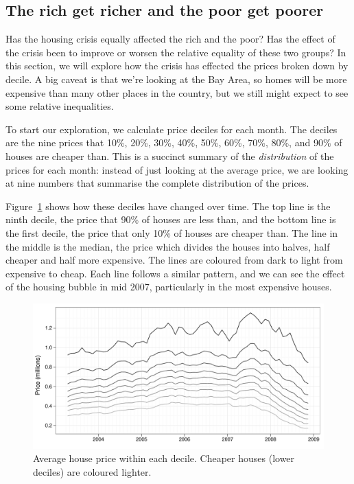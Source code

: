 \documentclass[oneside]{article}
\begin{document}
\subsection{The rich get richer and the poor get poorer}

Has the housing crisis equally affected the rich and the poor?  Has the effect of the crisis been to improve or worsen the relative equality of these two groups?  In this section, we will explore how the crisis has effected the prices broken down by decile.  A big caveat is that we're looking at the Bay Area, so homes will be more expensive than many other places in the country, but we still might expect to see some relative inequalities.

To start our exploration, we calculate price deciles for each month.  The deciles are the nine prices that 10\%, 20\%, 30\%, 40\%, 50\%, 60\%, 70\%, 80\%, and 90\% of houses are cheaper than.  This is a succinct summary of the {\it distribution} of the prices for each month: instead of just looking at the average price, we are looking at nine numbers that summarise the complete distribution of the prices. 

Figure~\ref{fig:decile-raw} shows how these deciles have changed over time.  The top line is the ninth decile, the price that 90\% of houses are less than, and the bottom line is the first decile, the price that only 10\% of houses are cheaper than.  The line in the middle is the median, the price which divides the houses into halves, half cheaper and half more expensive.  The lines are coloured from dark to light from expensive to cheap.  Each line follows a similar pattern, and we can see the effect of the housing bubble in mid 2007, particularly in the most expensive houses.  

\begin{figure}[htbp]
  \centering
  \includegraphics[width=0.75\linewidth]{decile-raw}
  \caption{Average house price within each decile.  Cheaper houses (lower deciles) are coloured lighter.} 
  \label{fig:decile-raw}
\end{figure}
\end{document}
